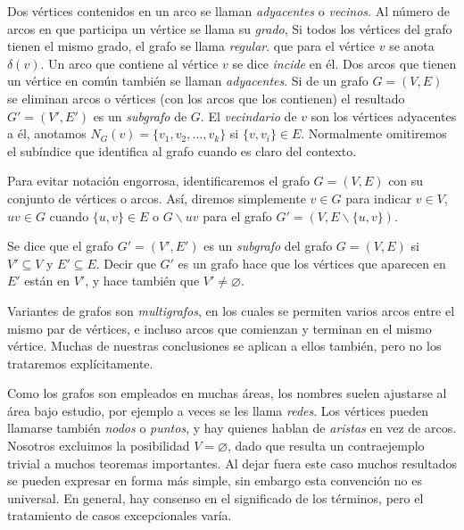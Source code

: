   Dos vértices contenidos en un arco se llaman \emph{adyacentes}%
  o \emph{vecinos}.%
  Al número de arcos en que participa un vértice se llama su \emph{grado},%
  Si todos los vértices del grafo tienen el mismo grado,
  el grafo se llama \emph{regular}.%
  que para el vértice \(v\) se anota \(\delta(v)\).%
  Un arco que contiene al vértice \(v\) se dice \emph{incide} en él.
  Dos arcos que tienen un vértice en común
  también se llaman \emph{adyacentes}.%
  Si de un grafo \(G = (V, E)\)
  se eliminan arcos o vértices
  (con los arcos que los contienen)
  el resultado \(G' = (V', E')\)
  es un \emph{subgrafo} de \(G\).%
  El \emph{vecindario} de \(v\) son los vértices adyacentes a él,%
  anotamos \(N_G(v) = \{v_1, v_2, \dotsc, v_k\}\)
  si \(\{v, v_i\} \in E\).
  Normalmente omitiremos el subíndice que identifica al grafo
  cuando es claro del contexto.

  Para evitar notación engorrosa,
  identificaremos el grafo \(G = (V, E)\)
  con su conjunto de vértices o arcos.
  Así,
  diremos simplemente \(v \in G\) para indicar \(v \in V\),
  \(u v \in G\) cuando \(\{u, v\} \in E\)
  o \(G \smallsetminus u v\)
  para el grafo \(G' = (V, E \smallsetminus \{u, v\})\).

  Se dice que el grafo \(G' = (V', E')\)
  es un \emph{subgrafo} del grafo \(G = (V, E)\)
  si \(V' \subseteq V\) y \(E' \subseteq E\).
  Decir que \(G'\) es un grafo
  hace que los vértices que aparecen en \(E'\)
  están en \(V'\),
  y hace también que \(V' \ne \varnothing\).

  Variantes de grafos son \emph{multigrafos},%
  en los cuales se permiten varios arcos
  entre el mismo par de vértices,
  e incluso arcos que comienzan y terminan en el mismo vértice.
  Muchas de nuestras conclusiones se aplican a ellos también,
  pero no los trataremos explícitamente.

  Como los grafos son empleados en muchas áreas,
  los nombres suelen ajustarse al área bajo estudio,
  por ejemplo a veces se les llama \emph{redes}.%
  Los vértices pueden llamarse también \emph{nodos}%
  o \emph{puntos},%
  y hay quienes hablan de \emph{aristas} en vez de arcos.%
  Nosotros excluimos la posibilidad \(V = \varnothing\),
  dado que resulta un contraejemplo trivial
  a muchos teoremas importantes.
  Al dejar fuera este caso muchos resultados
  se pueden expresar en forma más simple,
  sin embargo esta convención no es universal.
  En general,
  hay consenso en el significado de los términos,
  pero el tratamiento de casos excepcionales varía.

